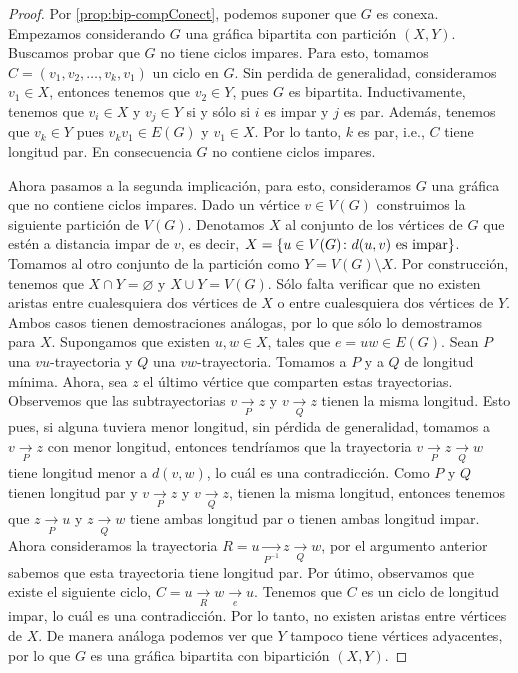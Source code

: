 \begin{proof}
    Por \cref{prop:bip-compConect}, podemos suponer que $G$ es conexa. Empezamos
    considerando $G$ una gr\'afica bipartita con partici\'on $(X,Y)$. Buscamos
    probar que $G$ no tiene ciclos impares. Para esto, tomamos
    $C=(v_1,v_2,\dots, v_k,v_1)$ un ciclo en $G$. Sin perdida de generalidad,
    consideramos $v_1 \in X$, entonces tenemos que $v_2 \in Y$, pues $G$ es
    bipartita. Inductivamente, tenemos que $v_i \in X$ y $v_j \in Y$ si y s\'olo
    si $i$ es impar y $j$ es par. Adem\'as, tenemos que $v_k \in Y$ pues $v_k
    v_1 \in E(G)$ y $v_1 \in X$. Por lo tanto, $k$ es par, i.e., $C$ tiene
    longitud par. En consecuencia $G$ no contiene ciclos impares.

    Ahora pasamos a la segunda implicaci\'on, para esto, consideramos $G$ una
    gr\'afica que no contiene ciclos impares. Dado un v\'ertice $v \in V(G)$
    construimos la siguiente partici\'on de $V(G)$. Denotamos $X$ al conjunto de
    los v\'ertices de $G$ que est\'en a distancia impar de $v$, es decir, $X =
    \{u \in V(G) \colon d(u,v) \textnormal{ es impar}\}$. Tomamos al otro
    conjunto de la partici\'on como $Y = V(G)\setminus X$. Por construcci\'on,
    tenemos que $X \cap Y = \varnothing$ y $X \cup Y = V(G)$. S\'olo falta
    verificar que no existen aristas entre cualesquiera dos v\'ertices de $X$ o
    entre cualesquiera dos v\'ertices de $Y$. Ambos casos tienen demostraciones
    an\'alogas, por lo que s\'olo lo demostramos para $X$. Supongamos que
    existen $u,w \in X$, tales que $e=uw \in E(G)$. Sean $P$ una
    $vu$-trayectoria y $Q$ una $vw$-trayectoria. Tomamos a $P$ y a $Q$ de
    longitud m\'inima. Ahora, sea $z$ el \'ultimo v\'ertice que comparten estas
    trayectorias. Observemos que las subtrayectorias $v \xrightarrow[P]{}z$ y $v
    \xrightarrow[Q]{}z$ tienen la misma longitud. Esto pues, si alguna tuviera
    menor longitud, sin p\'erdida de generalidad, tomamos a $v
    \xrightarrow[P]{}z$ con menor longitud, entonces tendr\'iamos que la
    trayectoria $v \xrightarrow[P]{}z\xrightarrow[Q]{}w$ tiene longitud menor a
    $d(v,w)$, lo cu\'al es una contradicci\'on. Como $P$ y $Q$ tienen longitud
    par y $v \xrightarrow[P]{}z$ y $v \xrightarrow[Q]{}z$, tienen la misma
    longitud, entonces tenemos que $z \xrightarrow[P]{}u$ y $z
    \xrightarrow[Q]{}w$ tiene ambas longitud par o tienen ambas longitud impar.
    Ahora consideramos la trayectoria $ R= u \xrightarrow[P^{-1}]{}z
    \xrightarrow[Q]{}w$, por el argumento anterior sabemos que esta trayectoria
    tiene longitud par. Por \'utimo, observamos que existe el siguiente ciclo,
    $C=u\xrightarrow[R]{}w\xrightarrow[e]{}u$. Tenemos que $C$ es un ciclo de
    longitud impar, lo cu\'al es una contradicci\'on. Por lo tanto, no existen
    aristas entre v\'ertices de $X$. De manera an\'aloga podemos ver que $Y$
    tampoco tiene v\'ertices adyacentes, por lo que $G$ es una gr\'afica
    bipartita con bipartici\'on $(X,Y)$.
\end{proof}
    
